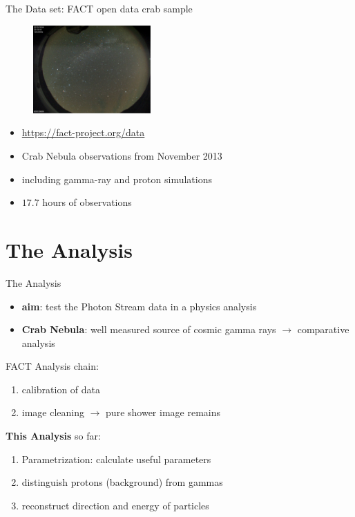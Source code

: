 \begin{frame}[t]{The Data set: FACT open data crab sample}
    \begin{multicols}{2}
        \begin{figure}
            \centering
            \includegraphics[width=0.4\textwidth]{fig/cond.png}
        \end{figure}
    \columnbreak
    \vspace*{\fill}
        \begin{itemize}
            \item \url{https://fact-project.org/data}
            \item Crab Nebula observations from November 2013
            \item including gamma-ray and proton simulations
            \item $17.7$ hours of observations
        \end{itemize}
    \vspace*{\fill}
  \end{multicols}
\end{frame}

\section{The Analysis}

\begin{frame}[t]{The Analysis}
    \begin{itemize}
        \item \textbf{{\color{tugreen} aim}}: test the Photon Stream data in a physics analysis
        \item \textbf{{\color{tugreen} Crab Nebula}}: well measured source of cosmic gamma rays $\rightarrow$ comparative analysis 
    \end{itemize}
FACT Analysis chain:
    \begin{enumerate}
        \item calibration of data
        \item image cleaning $\rightarrow$ pure shower image remains
    \end{enumerate}
\textbf{{\color{tugreen} This Analysis}} so far:
    \begin{enumerate}\addtocounter{enumi}{2}
        \item Parametrization: calculate useful parameters
        \item distinguish protons (background) from gammas
        \item reconstruct direction and energy of particles
    \end{enumerate}
\end{frame}

